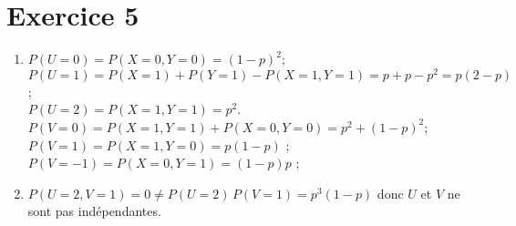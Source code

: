 \part{Exercice 5}

\begin{enumerate}
	\item
		$P(U = 0) = P(X = 0, Y = 0) = (1-p)^2$;\\
		$P(U = 1) = P(X = 1) + P(Y = 1) - P(X = 1, Y = 1) = p + p - p^2 = p(2-p)$;\\
		$P(U = 2) = P(X = 1, Y = 1) = p^2$.\\[3mm]

		$P(V = 0) = P(X = 1, Y = 1) + P(X = 0, Y = 0) = p^2 + (1-p)^2$; \\
		$P(V = 1) = P(X = 1, Y = 0) = p(1-p)$ ;\\
		$P(V = -1) = P(X = 0, Y = 1) = (1-p)p$ ;\\
	\item $P(U = 2, V = 1) = 0 \neq P(U = 2)\,P(V = 1) = p^3(1-p)$ donc $U$ et $V$ ne sont pas indépendantes.
\end{enumerate}
